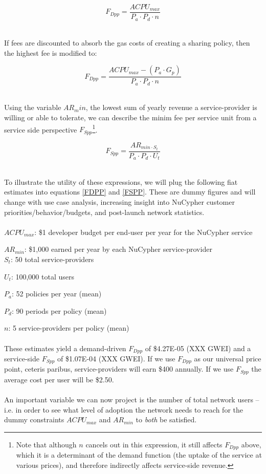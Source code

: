 \documentclass[longbibliography,nofootinbib]{revtex4-1}
\begin{document}
\begin{equation}
\label{FDPP}
    F_{Dpp} = \frac{ACPU_{max}}{P_a \cdot P_d \cdot n}
\end{equation} \

If fees are discounted to absorb the gas costs of creating a sharing policy, then the highest fee is modified to: 

\begin{equation}
    F_{Dpp} = \frac{ACPU_{max} - (P_a \cdot G_p)}{P_a \cdot P_d \cdot n}
\end{equation} \

Using the variable $AR_min$, the lowest sum of yearly revenue a service-provider is willing or able to tolerate, we can describe the minim fee per service unit from a service side perspective $F_{Spp}$\footnote{Note that although $n$ cancels out in this expression, it still affects $F_{Dpp}$ above, which it is a determinant of the demand function (the uptake of the service at various prices), and therefore indirectly affects service-side revenue.}.

\begin{equation}
\label{FSPP}
    F_{Spp} = \frac{AR_{min \cdot S_t}}{P_a \cdot P_d \cdot U_t}
\end{equation} \ 

To illustrate the utility of these expressions, we will plug the following fiat estimates into equations \ref{FDPP} and \ref{FSPP}. These are dummy figures and will change with  use case analysis, increasing insight into NuCypher customer priorities/behavior/budgets, and post-launch network statistics.
\\\\

$ACPU_{max}$: \$1 developer budget per end-user per year for the NuCypher service

$AR_{min}$: \$1,000 earned per year by each NuCypher service-provider
\\

$S_t$: 50 total service-providers

$U_t$: 100,000 total users

$P_a$: 52 policies per year (mean)

$P_d$: 90 periods per policy (mean)

$n$: 5 service-providers per policy (mean)
\\\\
These estimates yield a demand-driven $F_{Dpp}$ of \$4.27E-05 (XXX GWEI) and a service-side $F_{Spp}$ of \$1.07E-04 (XXX GWEI). If we use $F_{Dpp}$ as our universal price point, ceteris paribus, service-providers will earn \$400 annually. If we use $F_{Spp}$ the average cost per user will be \$2.50. 
\\\\
An important variable we can now project is the number of total network users – i.e. in order to see what level of adoption the network needs to reach for the dummy constraints $ACPU_{max}$ and $AR_{min}$ to \textit{both} be satisfied.
\end{document}
